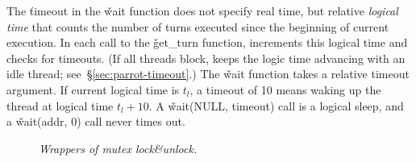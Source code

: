 
The \v{timeout} in the \v{wait} function does not specify real time, but relative \emph{logical time} that
counts the number of turns executed since the beginning of current
execution.  In each call to the \v{get\_turn} function, \parrot increments this logical
time and checks for timeouts. 
(If all threads block, \parrot keeps the logic time advancing with an idle
thread; see~\S\ref{sec:parrot-timeout}.)
The \v{wait} function takes a relative timeout argument.  If
current logical time is $t_l$, a timeout of 10 means waking up the thread
at logical time $t_l + 10$. A \v{wait(NULL, timeout)} 
call is a logical sleep, and a \v{wait(addr, 0)} call never times out.

\begin{figure}[t]
\centering
\begin{minipage}[t]{.38\textwidth}
\end{minipage}
\vspace{-1 mm}
\caption{{\em Wrappers of \pthread mutex lock\&unlock.}} \label{fig:parrot-lock}
\vspace{-0.0in}
\end{figure}


